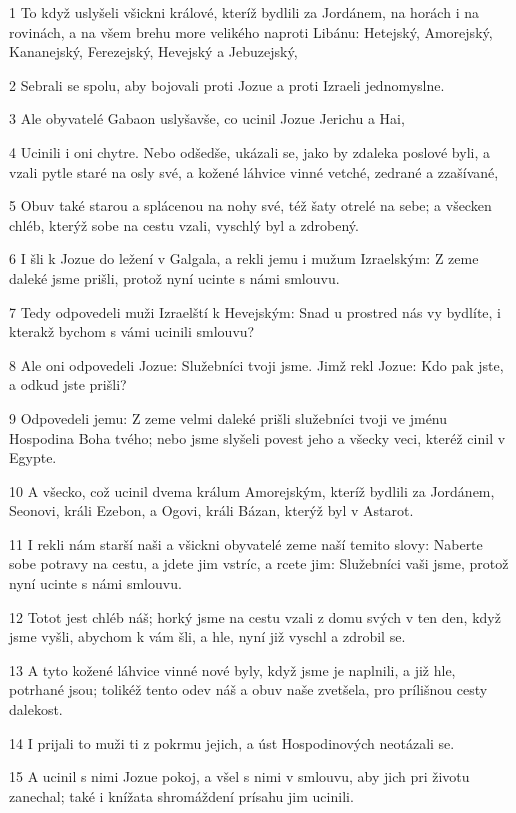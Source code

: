 \par 1 To když uslyšeli všickni králové, kteríž bydlili za Jordánem, na horách i na rovinách, a na všem brehu more velikého naproti Libánu: Hetejský, Amorejský, Kananejský, Ferezejský, Hevejský a Jebuzejský,
\par 2 Sebrali se spolu, aby bojovali proti Jozue a proti Izraeli jednomyslne.
\par 3 Ale obyvatelé Gabaon uslyšavše, co ucinil Jozue Jerichu a Hai,
\par 4 Ucinili i oni chytre. Nebo odšedše, ukázali se, jako by zdaleka poslové byli, a vzali pytle staré na osly své, a kožené láhvice vinné vetché, zedrané a zzašívané,
\par 5 Obuv také starou a splácenou na nohy své, též šaty otrelé na sebe; a všecken chléb, kterýž sobe na cestu vzali, vyschlý byl a zdrobený.
\par 6 I šli k Jozue do ležení v Galgala, a rekli jemu i mužum Izraelským: Z zeme daleké jsme prišli, protož nyní ucinte s námi smlouvu.
\par 7 Tedy odpovedeli muži Izraelští k Hevejským: Snad u prostred nás vy bydlíte, i kterakž bychom s vámi ucinili smlouvu?
\par 8 Ale oni odpovedeli Jozue: Služebníci tvoji jsme. Jimž rekl Jozue: Kdo pak jste, a odkud jste prišli?
\par 9 Odpovedeli jemu: Z zeme velmi daleké prišli služebníci tvoji ve jménu Hospodina Boha tvého; nebo jsme slyšeli povest jeho a všecky veci, kteréž cinil v Egypte.
\par 10 A všecko, což ucinil dvema králum Amorejským, kteríž bydlili za Jordánem, Seonovi, králi Ezebon, a Ogovi, králi Bázan, kterýž byl v Astarot.
\par 11 I rekli nám starší naši a všickni obyvatelé zeme naší temito slovy: Naberte sobe potravy na cestu, a jdete jim vstríc, a rcete jim: Služebníci vaši jsme, protož nyní ucinte s námi smlouvu.
\par 12 Totot jest chléb náš; horký jsme na cestu vzali z domu svých v ten den, když jsme vyšli, abychom k vám šli, a hle, nyní již vyschl a zdrobil se.
\par 13 A tyto kožené láhvice vinné nové byly, když jsme je naplnili, a již hle, potrhané jsou; tolikéž tento odev náš a obuv naše zvetšela, pro prílišnou cesty dalekost.
\par 14 I prijali to muži ti z pokrmu jejich, a úst Hospodinových neotázali se.
\par 15 A ucinil s nimi Jozue pokoj, a všel s nimi v smlouvu, aby jich pri životu zanechal; také i knížata shromáždení prísahu jim ucinili.
